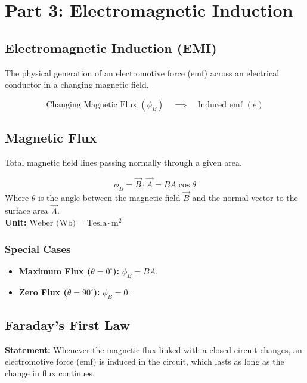 \documentclass[11pt,a4paper]{article}
\begin{document}
\newpage
\section{Part 3: Electromagnetic Induction}

\subsection{Electromagnetic Induction (EMI)}
The physical generation of an electromotive force (emf) across an electrical conductor in a changing magnetic field.
\begin{formulabox}
    \[ \text{Changing Magnetic Flux } (\phi_B) \quad \implies \quad \text{Induced emf } (e) \]
\end{formulabox}

\subsection{Magnetic Flux}
Total magnetic field lines passing normally through a given area.
\begin{formulabox}
    \[ \phi_B = \vec{B} \cdot \vec{A} = BA \cos\theta \]
    Where $\theta$ is the angle between the magnetic field $\vec{B}$ and the normal vector to the surface area $\vec{A}$. \\
    \textbf{Unit:} $\text{Weber (Wb)} = \text{Tesla}\cdot\text{m}^2$
\end{formulabox}

\subsubsection{Special Cases}
\begin{itemize}
    \item \textbf{Maximum Flux ($\theta = 0^\circ$):} $\phi_B = BA$.
    \item \textbf{Zero Flux ($\theta = 90^\circ$):} $\phi_B = 0$.
\end{itemize}

\subsection{Faraday's First Law}
\begin{pyqbox}
    \textbf{Statement:} Whenever the magnetic flux linked with a closed circuit changes, an electromotive force (emf) is induced in the circuit, which lasts as long as the change in flux continues.
\end{pyqbox}
\end{document}
